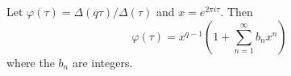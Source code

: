 Let $\varphi(\tau) = \Delta(q\tau)/\Delta(\tau)$ and $x = e^{2\pi i\tau}$. Then
$$\varphi(\tau) = x^{q-1} \left( 1 + \sum_{n=1}^{\infty} b_n x^n \right)$$
where the $b_n$ are integers.